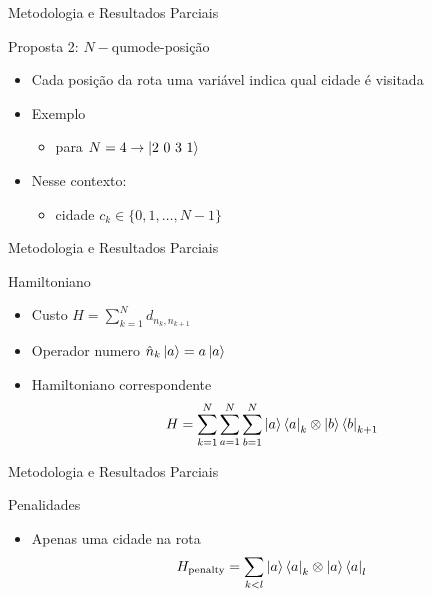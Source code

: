 \documentclass[xcolor={dvipsnames,table}]{beamer}
\begin{document}
\begin{frame}{Metodologia e Resultados Parciais}
    \begin{block}{Proposta 2: $N-$qumode-posição}
        \begin{itemize}
            \item Cada posição da rota uma variável indica qual cidade é visitada 
            \item Exemplo 
            \begin{itemize}
                \item para $N=4\rightarrow \ket{2\ 0\ 3 \ 1}$
            \end{itemize}
            \item Nesse contexto: 
            \begin{itemize}
                \item cidade $c_k\in\{0,1,\dots,N-1\}$
            \end{itemize}
        \end{itemize}
    \end{block}
\end{frame}

\begin{frame}{Metodologia e Resultados Parciais}
    \begin{block}{Hamiltoniano}
        \begin{itemize}
            \item Custo $H=\sum_{k=1}^{N} d_{n_k,n_{k+1}}$ 
            \item Operador numero $\hat{n}_k\ket{a}=a\ket{a}$
            \item Hamiltoniano correspondente
            $$
            H=\sum_{k=1}^{N} \sum_{a=1}^{N}\sum_{b=1}^{N} \ket{a}\bra{a}_k\otimes\ket{b}\bra{b}_{k+1}
            $$
        \end{itemize}
    \end{block}
\end{frame}

\begin{frame}{Metodologia e Resultados Parciais}
    \begin{block}{Penalidades}
        \begin{itemize}
            \item Apenas uma cidade na rota $$H_{\text{penalty}}=\sum_{k<l} \ket{a}\bra{a}_k\otimes \ket{a}\bra{a}_l$$
        \end{itemize}
    \end{block}
\end{frame}
\end{document}
